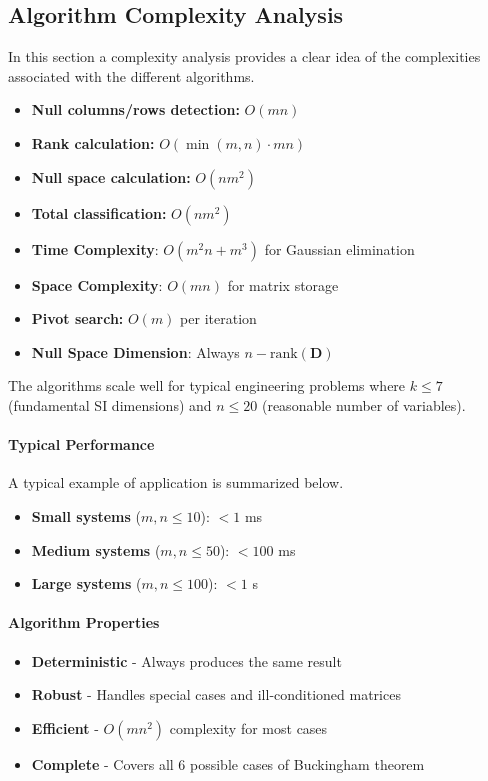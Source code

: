 \documentclass[
	11pt, %
	fleqn, %
	a4paper, %
]{LegrandOrangeBook}
\begin{document}
\subsection{Algorithm Complexity Analysis}
In this section a complexity analysis provides a clear idea of the complexities associated with the different algorithms.
\begin{itemize}
\item \textbf{Null columns/rows detection:} $O(mn)$
\item \textbf{Rank calculation:} $O(\min(m,n) \cdot mn)$
\item \textbf{Null space calculation:} $O(nm^2)$
\item \textbf{Total classification:} $O(nm^2)$
\item \textbf{Time Complexity}: $O(m^2 n + m^3)$ for Gaussian elimination
\item \textbf{Space Complexity}: $O(mn)$ for matrix storage
\item \textbf{Pivot search:} $O(m)$ per iteration
\item \textbf{Null Space Dimension}: Always $n - \text{rank}(\mathbf{D})$
\end{itemize}

The algorithms scale well for typical engineering problems where $k \leq 7$ (fundamental SI dimensions) and $n \leq 20$ (reasonable number of variables).

\paragraph{Typical Performance}
A typical example of application is summarized below.
\begin{itemize}
\item \textbf{Small systems} ($m,n \leq 10$): $< 1$ ms
\item \textbf{Medium systems} ($m,n \leq 50$): $< 100$ ms
\item \textbf{Large systems} ($m,n \leq 100$): $< 1$ s
\end{itemize}


\paragraph{Algorithm Properties}
\begin{itemize}
\item \textbf{Deterministic} - Always produces the same result
\item \textbf{Robust} - Handles special cases and ill-conditioned matrices
\item \textbf{Efficient} - $O(mn^2)$ complexity for most cases
\item \textbf{Complete} - Covers all 6 possible cases of Buckingham theorem
\end{itemize}
\end{document}
